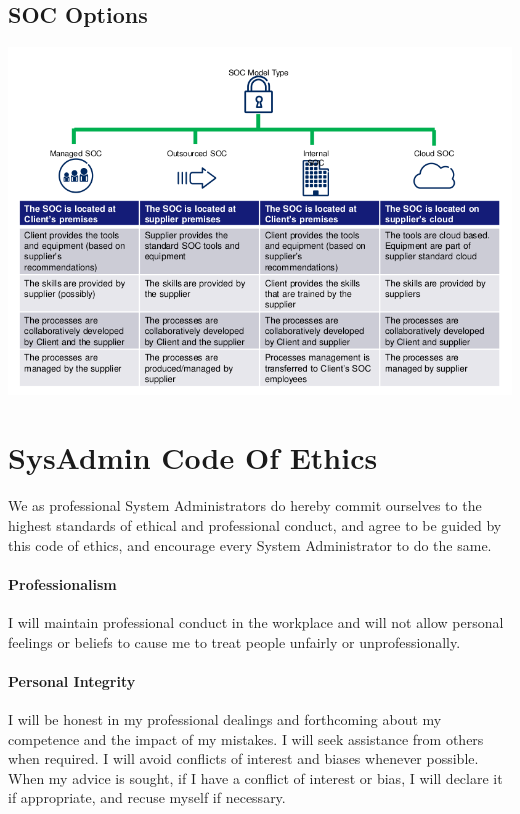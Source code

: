 \documentclass[a4]{article}
\begin{document}
\begin{multicols}{3}
\subsection{SOC Options}
\begin{center}
    \begin{minipage}{\columnwidth}
        \includegraphics[width=\columnwidth]{soc-options.png}
    \end{minipage}
\end{center}


\section{SysAdmin Code Of Ethics}
We as professional System Administrators do hereby commit ourselves to the highest standards of
ethical and professional conduct, and agree to be guided by this code of ethics, and encourage every
System Administrator to do the same.

\paragraph{Professionalism} I will maintain professional conduct in the workplace and will not allow personal
feelings or beliefs to cause me to treat people unfairly or unprofessionally.
\paragraph{Personal Integrity} I will be honest in my professional dealings and forthcoming about my competence
and the impact of my mistakes. I will seek assistance from others when required.
I will avoid conflicts of interest and biases whenever possible. When my advice is sought, if I have a
conflict of interest or bias, I will declare it if appropriate, and recuse myself if necessary.

\end{multicols}
\end{document}

